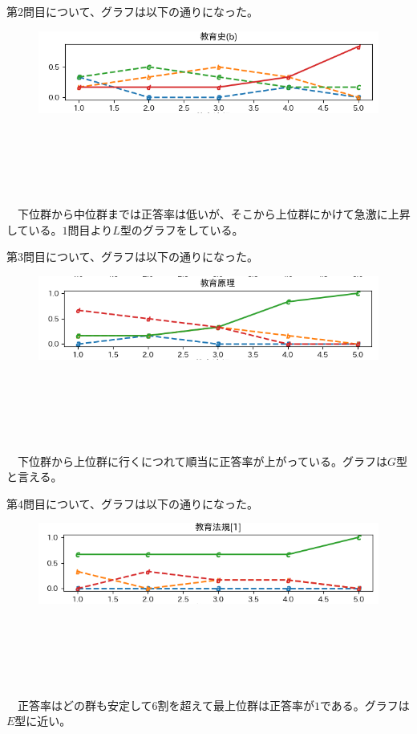 \documentclass[12pt]{jarticle}
\begin{document}
第$2$問目について、グラフは以下の通りになった。
\begin{figure}[H]
  \includegraphics[bb = -7 60 1 1,scale = 1.5]{Figure_2.png}
\end{figure}
\leavevmode \\
\\
\\
\\
\\
\ \ 下位群から中位群までは正答率は低いが、そこから上位群にかけて急激に上昇している。$1$問目より$L$型のグラフをしている。

第$3$問目について、グラフは以下の通りになった。
\begin{figure}[H]
  \includegraphics[bb = -7 60 1 1,scale = 1.5]{Figure_3.png}
\end{figure}
\leavevmode \\
\\
\\
\\
\\
\ \ 下位群から上位群に行くにつれて順当に正答率が上がっている。グラフは$G$型と言える。

第$4$問目について、グラフは以下の通りになった。
\begin{figure}[H]
  \includegraphics[bb = -7 60 1 1,scale = 1.5]{Figure_4.png}
\end{figure}
\leavevmode \\
\\
\\
\\
\\
\ \ 正答率はどの群も安定して$6$割を超えて最上位群は正答率が$1$である。グラフは$E$型に近い。
\end{document}
